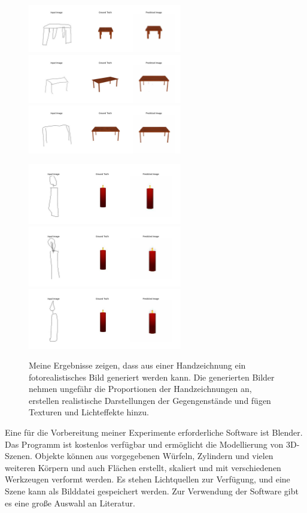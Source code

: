\begin{figure}[h]
	\centering
	\includegraphics[width=0.6\textwidth]{bilder/table1small.png}
	\includegraphics[width=0.6\textwidth]{bilder/table2small.png}
	\includegraphics[width=0.6\textwidth]{bilder/table3small.png}

	\includegraphics[width=0.6\textwidth]{bilder/candle1small.png}
	\includegraphics[width=0.6\textwidth]{bilder/candle2small.png}
	\includegraphics[width=0.6\textwidth]{bilder/candle3small.png}
	\caption[Eigene Beispiele]{Meine Ergebnisse zeigen, dass aus einer Handzeichnung ein fotorealistisches Bild generiert werden kann. Die generierten Bilder nehmen ungefähr die Proportionen der Handzeichnungen an, erstellen realistische Darstellungen der Gegengenstände und fügen Texturen und Lichteffekte hinzu.}
	\label{fig:myexamples}
\end{figure}

Eine für die Vorbereitung meiner Experimente erforderliche Software ist Blender. Das Programm ist kostenlos verfügbar und ermöglicht die Modellierung von 3D-Szenen. Objekte können aus vorgegebenen Würfeln, Zylindern und vielen weiteren Körpern und auch Flächen erstellt, skaliert und mit verschiedenen Werkzeugen verformt werden. Es stehen Lichtquellen zur Verfügung, und eine Szene kann als Bilddatei gespeichert werden. Zur Verwendung der Software gibt es eine große Auswahl an Literatur.
